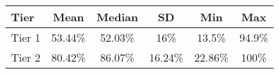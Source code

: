 \begin{tabular}{lccccc}
\toprule 
\midrule 
Tier & Mean & Median & SD & Min & Max \\
\midrule 
Tier 1 & 53.44\% & 52.03\% & 16\% & 13.5\% & 94.9\% \\
Tier 2 & 80.42\% & 86.07\% & 16.24\% & 22.86\% & 100\% \\
\midrule 
\bottomrule 
\end{tabular}
